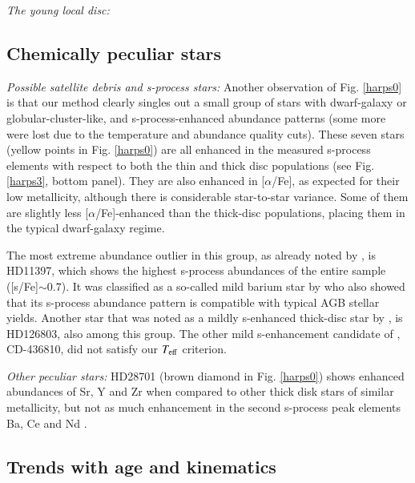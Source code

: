 \documentclass{aa}  %
\begin{document}
{\it The young local disc:}

\subsection{Chemically peculiar stars}

{\it Possible satellite debris and s-process stars:} Another observation of Fig. \ref{harps0} is that our method clearly singles out a small group of stars with dwarf-galaxy or globular-cluster-like, and s-process-enhanced abundance patterns (some more were lost due to the temperature and abundance quality cuts). These seven stars (yellow points in Fig. \ref{harps0}) are all enhanced in the measured s-process elements with respect to both the thin and thick disc populations (see Fig. \ref{harps3}, bottom panel). They are also enhanced in [$\alpha$/Fe], as expected for their low metallicity, although there is considerable star-to-star variance. Some of them are slightly less [$\alpha$/Fe]-enhanced than the thick-disc populations, placing them in the typical dwarf-galaxy regime. 

The most extreme abundance outlier in this group, as already noted by \citet{DelgadoMena2017}, is HD11397, which shows the highest s-process abundances of the entire sample ([s/Fe]$\sim0.7$). It was classified as a so-called mild barium star by \citet{Pompeia2008} who also showed that its s-process abundance pattern is compatible with typical AGB stellar yields. 
Another star that was noted as a mildly s-enhanced thick-disc star by \citet{DelgadoMena2017}, is HD126803, also among this group. The other mild s-enhancement candidate of \citet{DelgadoMena2017}, CD-436810, did not satisfy our $T_{\rm eff}$ criterion.



{\it Other peculiar stars:} HD28701 (brown diamond in Fig. \ref{harps0}) shows enhanced abundances of Sr, Y and Zr when compared to other thick disk stars of similar metallicity, but not as much enhancement in the second s-process peak elements Ba, Ce and Nd \citep{DelgadoMena2017}.

\subsection{Trends with age and kinematics}
\end{document}
